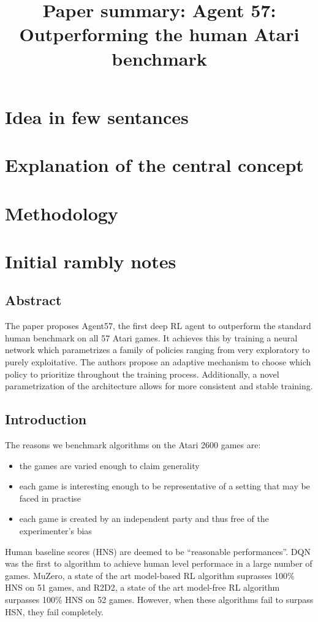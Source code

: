 \documentclass{article}
\title{Paper summary: Agent 57: Outperforming the human Atari benchmark}
\begin{document}
\maketitle


\section{Idea in few sentances}



\section{Explanation of the central concept}




\section{Methodology}


\section{Initial rambly notes}


\subsection{Abstract}
The paper proposes Agent57, the first deep RL agent to outperform the standard human benchmark on all 57 Atari games.
It achieves this by training a neural network which parametrizes a family of policies ranging from very exploratory to purely exploitative.
The authors propose an adaptive mechanism to choose which policy to prioritize throughout the training process.
Additionally, a novel parametrization of the architecture allows for more consistent and stable training.


\subsection{Introduction}
The reasons we benchmark algorithms on the Atari 2600 games are:
\begin{itemize}
		\item the games are varied enough to claim generality
		\item each game is interesting enough to be representative of a setting that may be faced in practise
		\item each game is created by an independent party and thus free of the experimenter's bias
\end{itemize}
Human baseline scores (HNS) are deemed to be ``reasonable performances''.
DQN was the first to algorithm to achieve human level performace in a large number of games.
MuZero, a state of the art model-based RL algorithm suprasses 100\% HNS on 51 games,
and R2D2, a state of the art model-free RL algorithm surpasses 100\% HNS on 52 games.
However, when these algorithms fail to surpass HSN, they fail completely.
\end{document}
